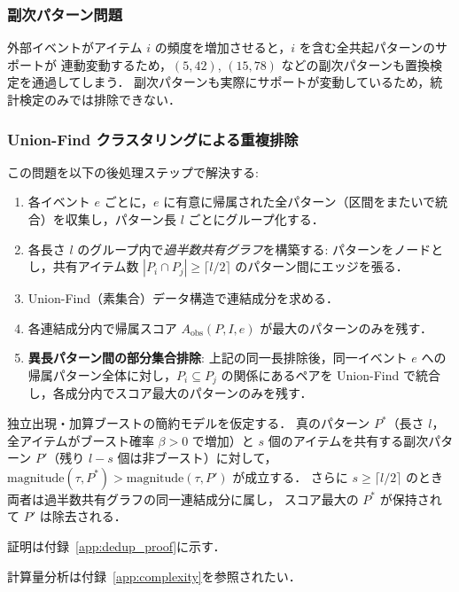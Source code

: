 

\subsubsection{副次パターン問題}

外部イベントがアイテム $i$ の頻度を増加させると，$i$ を含む全共起パターンのサポートが
連動変動するため，$(5, 42)$, $(15, 78)$ などの副次パターンも置換検定を通過してしまう．
副次パターンも実際にサポートが変動しているため，統計検定のみでは排除できない．

\subsubsection{Union-Find クラスタリングによる重複排除}

この問題を以下の後処理ステップで解決する:

\begin{enumerate}
\item 各イベント $e$ ごとに，$e$ に有意に帰属された全パターン（区間をまたいで統合）を収集し，パターン長 $l$ ごとにグループ化する．
\item 各長さ $l$ のグループ内で\emph{過半数共有グラフ}を構築する:
パターンをノードとし，共有アイテム数 $|P_i \cap P_j| \geq \lceil l/2 \rceil$ のパターン間にエッジを張る．
\item Union-Find（素集合）データ構造で連結成分を求める．
\item 各連結成分内で帰属スコア $A_{\text{obs}}(P, I, e)$ が最大のパターンのみを残す．
\item \textbf{異長パターン間の部分集合排除}: 上記の同一長排除後，同一イベント $e$ への帰属パターン全体に対し，$P_i \subseteq P_j$ の関係にあるペアを Union-Find で統合し，各成分内でスコア最大のパターンのみを残す．
\end{enumerate}

\begin{claim}\label{prop:dedup}
独立出現・加算ブーストの簡約モデルを仮定する．
真のパターン $P^*$（長さ $l$，全アイテムがブースト確率 $\beta > 0$ で増加）と
$s$ 個のアイテムを共有する副次パターン $P'$（残り $l-s$ 個は非ブースト）に対して，
$\text{magnitude}(\tau, P^*) > \text{magnitude}(\tau, P')$ が成立する．
さらに $s \geq \lceil l/2 \rceil$ のとき両者は過半数共有グラフの同一連結成分に属し，
スコア最大の $P^*$ が保持されて $P'$ は除去される．
\end{claim}

証明は付録~\ref{app:dedup_proof}に示す．

計算量分析は付録~\ref{app:complexity}を参照されたい．
